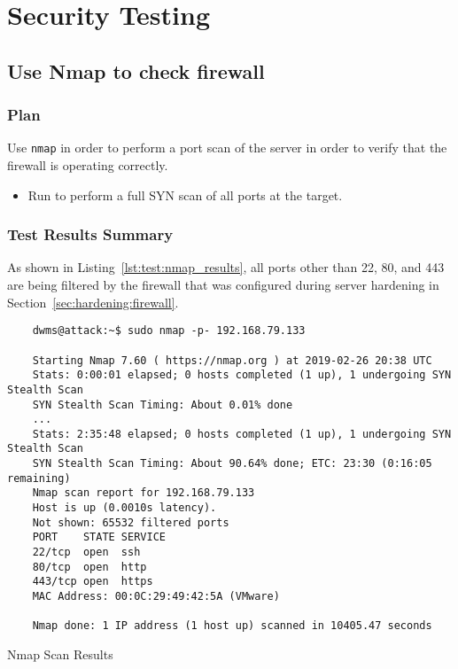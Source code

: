 \section{Security Testing}
\subsection{Use Nmap to check firewall}
\subsubsection*{Plan}
Use \texttt{nmap} in order to perform a port scan of the server in order to verify that the firewall is operating correctly.
\begin{itemize}
  \item Run  to perform a full SYN scan of all ports at the target.
\end{itemize}

\subsubsection*{Test Results Summary}
As shown in Listing~\ref{lst:test:nmap_results}, all ports other than 22, 80, and 443 are being filtered by the firewall that was configured during server hardening in Section~\ref{sec:hardening:firewall}.
\begin{listing}[H]
  \captionsetup{skip=\skiplistingcaptionlen}
  \begin{verbatim}
    dwms@attack:~$ sudo nmap -p- 192.168.79.133

    Starting Nmap 7.60 ( https://nmap.org ) at 2019-02-26 20:38 UTC
    Stats: 0:00:01 elapsed; 0 hosts completed (1 up), 1 undergoing SYN Stealth Scan
    SYN Stealth Scan Timing: About 0.01% done
    ...
    Stats: 2:35:48 elapsed; 0 hosts completed (1 up), 1 undergoing SYN Stealth Scan
    SYN Stealth Scan Timing: About 90.64% done; ETC: 23:30 (0:16:05 remaining)
    Nmap scan report for 192.168.79.133
    Host is up (0.0010s latency).
    Not shown: 65532 filtered ports
    PORT    STATE SERVICE
    22/tcp  open  ssh
    80/tcp  open  http
    443/tcp open  https
    MAC Address: 00:0C:29:49:42:5A (VMware)

    Nmap done: 1 IP address (1 host up) scanned in 10405.47 seconds
  \end{verbatim}
  \caption{Nmap Scan Results}
  \label{lst:test:nmap_results}
\end{listing}

